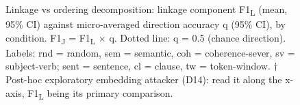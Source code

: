 \begin{figure}[t]\centering

\caption{Linkage vs ordering decomposition: linkage component F1\textsubscript{L} (mean, 95\% CI) against micro-averaged direction accuracy q (95\% CI), by condition. F1\textsubscript{J} = F1\textsubscript{L} $\times$ q. Dotted line: q = 0.5 (chance direction). Labels: rnd = random, sem = semantic, coh = coherence-sever, sv = subject-verb; sent = sentence, cl = clause, tw = token-window. $\dagger$\,Post-hoc exploratory embedding attacker (D14): read it along the x-axis, F1\textsubscript{L} being its primary comparison.}
\label{fig:3}
\end{figure}
